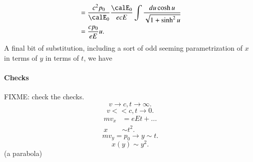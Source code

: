 {\begin{equation}
\begin{aligned}
&= \frac{c^2 p_0}{\calE_0}
\frac{\calE_0}{ e c E}
\int \frac{ du \cosh u }{\sqrt{1 + \sinh^2 u }} \\
&= \frac{c p_0}{ e E} u.
\end{aligned}
\end{equation}
%
A final bit of substitution, including a sort of odd seeming parametrization of \(x\) in terms of \(y\) in terms of \(t\), we have
%
\paragraph{Checks}
%
FIXME: check the checks.
%
\begin{equation}\label{eqn:relativisticElectrodynamicsT3:420}
v \rightarrow c, t \rightarrow \infty.
\end{equation}
%
\begin{equation}\label{eqn:relativisticElectrodynamicsT3:440}
v << c, t \rightarrow 0.
\end{equation}
%
\begin{equation}\label{eqn:relativisticElectrodynamicsT3:990}
\begin{aligned}
m v_x &= e E t + ... \\
x &\sim t^2.
\end{aligned}
\end{equation}
%
\begin{equation}\label{eqn:relativisticElectrodynamicsT3:460}
m v_y = p_0 \rightarrow y \sim t.
\end{equation}
%
\begin{equation}\label{eqn:relativisticElectrodynamicsT3:480}
x(y) \sim y^2.
\end{equation}
%
(a parabola)
%
}
